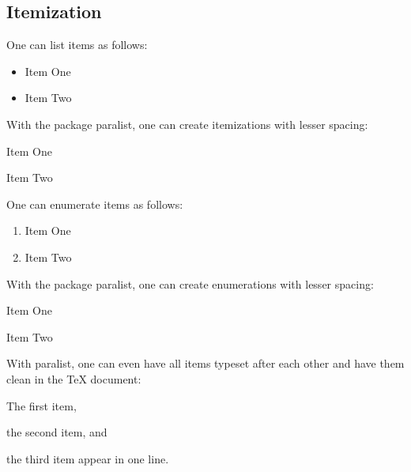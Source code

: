 \subsection{Itemization}

One can list items as follows:

\begin{ltgexample}
\begin{itemize}
  \item Item One
  \item Item Two
\end{itemize}
\end{ltgexample}

With the package paralist, one can create itemizations with lesser spacing:

\begin{ltgexample}
\begin{compactitem}
  \item Item One
  \item Item Two
\end{compactitem}
\end{ltgexample}

One can enumerate items as follows:

\begin{ltgexample}
\begin{enumerate}
  \item Item One
  \item Item Two
\end{enumerate}
\end{ltgexample}

With the package paralist, one can create enumerations with lesser spacing:

\begin{ltgexample}
\begin{compactenum}
  \item Item One
  \item Item Two
\end{compactenum}
\end{ltgexample}

With paralist, one can even have all items typeset after each other and have them clean in the TeX document:

\begin{ltgexample}
\begin{inparaenum}
  \item The first item,
  \item the second item, and
  \item the third item appear in one line.
\end{inparaenum}
\end{ltgexample}

